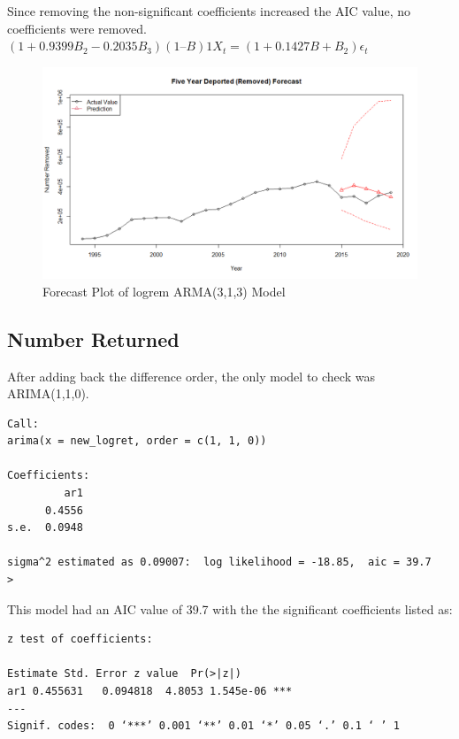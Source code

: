\documentclass[a4paper]{article}
\begin{document}
Since removing the non-significant coefficients increased the AIC value, no coefficients were removed. \\

$( 1 + 0.9399 B_2  - 0.2035 B_3 ) ( 1 – B )1 X_t = ( 1 + 0.1427 B + B_2)\epsilon_t$

\begin{figure}[h!]
\centering
\includegraphics[scale=0.3]{images/Numrem_forecast.png}
\caption{Forecast Plot of logrem ARMA(3,1,3) Model}
\label{fig:forecast numrem}
\end{figure}

\subsection{Number Returned}
After adding back the difference order, the only model to check was ARIMA(1,1,0). \\

\begin{verbatim}
Call:
arima(x = new_logret, order = c(1, 1, 0))

Coefficients:
         ar1
      0.4556
s.e.  0.0948

sigma^2 estimated as 0.09007:  log likelihood = -18.85,  aic = 39.7
> 
\end{verbatim}

This model had an AIC value of 39.7 with the the significant coefficients listed as: \\ 

\begin{verbatim}
z test of coefficients:

Estimate Std. Error z value  Pr(>|z|)    
ar1 0.455631   0.094818  4.8053 1.545e-06 ***
---
Signif. codes:  0 ‘***’ 0.001 ‘**’ 0.01 ‘*’ 0.05 ‘.’ 0.1 ‘ ’ 1

\end{verbatim}
\end{document}
